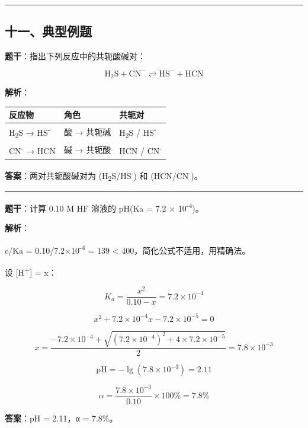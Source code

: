 \documentclass[a4paper,11pt]{ctexart}
\newcounter{none}
\begin{document}
\begin{center}\rule{0.5\linewidth}{0.5pt}\end{center}

\subsection{十一、典型例题}\label{ux5341ux4e00ux5178ux578bux4f8bux9898}

\textbf{题干}：指出下列反应中的共轭酸碱对：

\[
\mathrm{H_2S + CN^- \rightleftharpoons HS^- + HCN}
\]

\textbf{解析}：

{\def\LTcaptype{none} %
\begin{longtable}[]{@{}lll@{}}
\toprule\noalign{}
反应物 & 角色 & 共轭对 \\
\midrule\noalign{}
\endhead
\bottomrule\noalign{}
\endlastfoot
H\textsubscript{2}S → HS\textsuperscript{-} & 酸 → 共轭碱 & H\textsubscript{2}S / HS\textsuperscript{-} \\
CN\textsuperscript{-} → HCN & 碱 → 共轭酸 & HCN / CN\textsuperscript{-} \\
\end{longtable}
}

\textbf{答案}：两对共轭酸碱对为 (H\textsubscript{2}S/HS\textsuperscript{-}) 和 (HCN/CN\textsuperscript{-})。

\begin{center}\rule{0.5\linewidth}{0.5pt}\end{center}

\textbf{题干}：计算 0.10 M HF 溶液的 pH(Ka = 7.2 × 10\textsuperscript{-4})。

\textbf{解析}：

c/Ka = 0.10/7.2×10\textsuperscript{-4} = 139 \textless{} 400，简化公式不适用，用精确法。

设 {[}H\textsuperscript{+}{]} = x：

\[K_a = \frac{x^2}{0.10 - x} = 7.2 \times 10^{-4}\]

\[x^2 + 7.2 \times 10^{-4} x - 7.2 \times 10^{-5} = 0\]

\[x = \frac{-7.2 \times 10^{-4} + \sqrt{(7.2 \times 10^{-4})^2 + 4 \times 7.2 \times 10^{-5}}}{2} = 7.8 \times 10^{-3}\]

\[\mathrm{pH} = -\lg(7.8 \times 10^{-3}) = 2.11\]

\[\alpha = \frac{7.8 \times 10^{-3}}{0.10} \times 100\% = 7.8\%\]

\textbf{答案}：pH = 2.11，α = 7.8\%。
\end{document}
